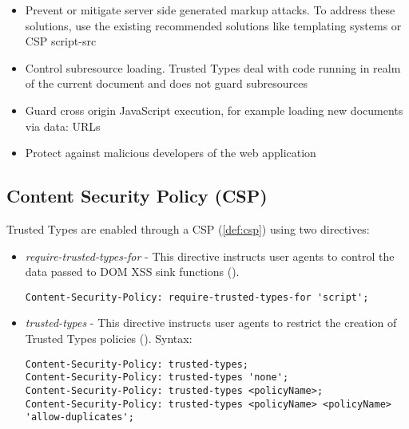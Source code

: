 \begin{itemize}
  \item Prevent or mitigate server side generated markup attacks. To address these solutions, use
        the existing recommended solutions like templating systems or CSP script-src
  \item Control subresource loading. Trusted Types deal with code running in realm of the current
        document and does not guard subresources
  \item Guard cross origin JavaScript execution, for example loading new documents via data: URLs
  \item Protect against malicious developers of the web application
\end{itemize}

\subsection{Content Security Policy (CSP)}
\label{csp}

Trusted Types are enabled through a CSP (\ref{def:csp}) using two directives:

\begin{itemize}
  \item \textit{require-trusted-types-for} - This directive instructs user agents to control the
        data passed to DOM XSS sink functions (\cite{mdn:require-trusted-types-for}).

        \bigskip
        \begin{lstlisting}[language={}, caption=Syntax of require-trusted-types-for directive]
Content-Security-Policy: require-trusted-types-for 'script';\end{lstlisting}

  \item \textit{trusted-types} - This directive instructs user agents to restrict the creation of
        Trusted Types policies (\cite{mdn:trusted-types}). Syntax:

        \bigskip
        \begin{lstlisting}[language={}, caption=Syntax of trusted-types directive]
Content-Security-Policy: trusted-types;
Content-Security-Policy: trusted-types 'none';
Content-Security-Policy: trusted-types <policyName>;
Content-Security-Policy: trusted-types <policyName> <policyName> 'allow-duplicates';\end{lstlisting}

\end{itemize}

